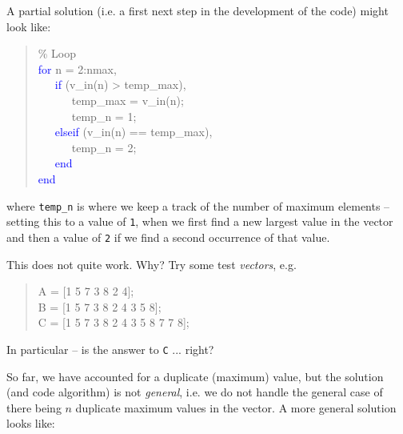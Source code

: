 \documentclass{tufte-book} %
\newenvironment{docspec}{\begin{quotation}\ttfamily\parskip0pt\parindent0pt\ignorespaces}{\end{quotation}}
\begin{document}
A partial solution (i.e. a first next step in the development of the code) might look like:
\begin{docspec}
\textcolor[rgb]{0,0.501961,0}{\% Loop}\\
\textcolor{blue}{for} n = 2:nmax,\\
\ \ \ \textcolor{blue}{if} (v\_in(n) > temp\_max),\\
\ \ \ \ \ \ temp\_max = v\_in(n);\\
\ \ \ \ \ \ temp\_n = 1;\\
\ \ \ \textcolor{blue}{elseif} (v\_in(n) == temp\_max),\\
\ \ \ \ \ \ temp\_n = 2;\\
\ \ \ \textcolor{blue}{end}\\
\textcolor{blue}{end}
\end{docspec}
where \texttt{temp\_n} is where we keep a track of the number of maximum elements -- setting this to a value of \texttt{1}, when we first find a new largest value in the vector and then a value of \texttt{2} if we find a second occurrence of that value.

This does not quite work. Why? Try  some test \textit{vectors}, e.g.
\begin{docspec}
A = [1 5 7 3 8 2 4];\\
B = [1 5 7 3 8 2 4 3 5 8];\\
C = [1 5 7 3 8 2 4 3 5 8 7 7 8];
\end{docspec}
In particular -- is the answer to \texttt{C} ... right?

So far, we have accounted for a duplicate (maximum) value, but the solution (and code algorithm) is not \textit{general}, i.e. we do not handle the general case of there being \(n\) duplicate maximum values in the vector. A more general solution looks like:
\end{document}
